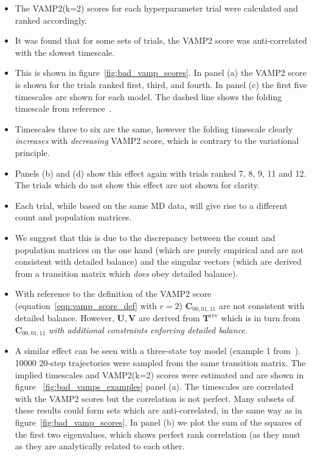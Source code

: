 \documentclass[journal=jacsat,manuscript=article]{achemso}
\begin{document}
\begin{itemize}
    \item The VAMP2(k=2) scores for each hyperparameter trial were calculated and ranked accordingly.  
    \item It was found that for some sets of trials, the VAMP2 score was anti-correlated with the slowest timescale. 
    \item This is shown in figure~\ref{fig:bad_vamp_scores}. In panel (a) the VAMP2 score is shown for the trials ranked first, third, and fourth. In panel (c) the first five timescales are shown for each model.  The dashed line shows the folding timescale from reference~\cite{lindorff-larsen_how_2011}.  
    \item Timescales three to six are the same, however the folding timescale clearly \emph{increases} with \emph{decreasing} VAMP2 score, which is contrary to the variational principle. 
    \item Panels (b) and (d) show this effect again with trials ranked 7, 8, 9, 11 and 12.  The trials which do not show this effect are not shown for clarity. 
    \item Each trial, while based on the same MD data, will give rise to a different count and population matrices. 
    \item We suggest that this is due to the discrepancy between the count and population matrices on the one hand (which are purely empirical and are not consistent with detailed balance) and the singular vectors (which are derived from a transition matrix which \emph{does} obey detailed balance). 
    \item With reference to the definition of the VAMP2 score (equation~\ref{eqn:vamp_score_def} with $r=2$) $\mathbf{C}_{00, 01, 11}$ are not consistent with detailed balance. However, $\mathbf{U}, \mathbf{V}$ are derived from $\mathbf{T}^{\mathrm{rev}}$ which is in turn from $\mathbf{C}_{00, 01, 11}$ \emph{with additional constraints enforcing detailed balance}. 
    \item A similar effect can be seen with a three-state toy model (example 1 from~\cite{trendelkamp-schroer_estimation_2015}). \num{10000} 20-step trajectories were sampled from the same transition matrix. The implied timescales and VAMP2(k=2) scores were estimated and are shown in figure ~\ref{fig:bad_vamps_examples} panel (a).  The timescales are correlated with the VAMP2 scores but the correlation is not perfect. Many subsets of these results could form sets which are anti-correlated, in the same way as in figure~\ref{fig:bad_vamp_scores}. In panel (b) we plot the sum of the squares of the first two eigenvalues, which shows perfect rank correlation (as they must as they are analytically related to each other. 
\end{itemize}
\end{document}
